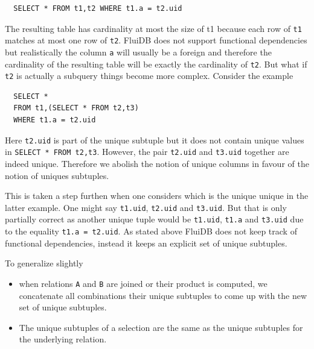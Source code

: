\begin{verbatim}
  SELECT * FROM t1,t2 WHERE t1.a = t2.uid
\end{verbatim}

The resulting table has cardinality at most the size of t1 because
each row of \texttt{t1} matches at most one row of \texttt{t2}. FluiDB does not
support functional dependencies but realistically the column \texttt{a} will
usually be a foreign and therefore the cardinality of the resulting
table will be exactly the cardinality of \texttt{t2}. But what if \texttt{t2} is
actually a subquery things become more complex. Consider the example

\begin{verbatim}
  SELECT *
  FROM t1,(SELECT * FROM t2,t3)
  WHERE t1.a = t2.uid
\end{verbatim}

Here \texttt{t2.uid} is part of the unique subtuple but it does not contain
unique values in \texttt{SELECT * FROM t2,t3}. However, the pair \texttt{t2.uid} and
\texttt{t3.uid} together are indeed unique. Therefore we abolish the notion
of unique columns in favour of the notion of uniques subtuples.

This is taken a step furthen when one considers which is the unique
unique in the latter example. One might say \texttt{t1.uid}, \texttt{t2.uid} and
\texttt{t3.uid}. But that is only partially correct as another unique tuple
would be \texttt{t1.uid}, \texttt{t1.a} and \texttt{t3.uid} due to the equality \texttt{t1.a =
  t2.uid}. As stated above FluiDB does not keep track of functional
dependencies, instead it keeps an explicit set of unique subtuples.

To generalize slightly

\begin{itemize}
\item when relations \texttt{A} and \texttt{B} are joined or their product is computed,
  we concatenate all combinations their unique subtuples to come up
  with the new set of unique subtuples.
\item The unique subtuples of a selection are the same as the unique
  subtuples for the underlying relation.
\end{itemize}


